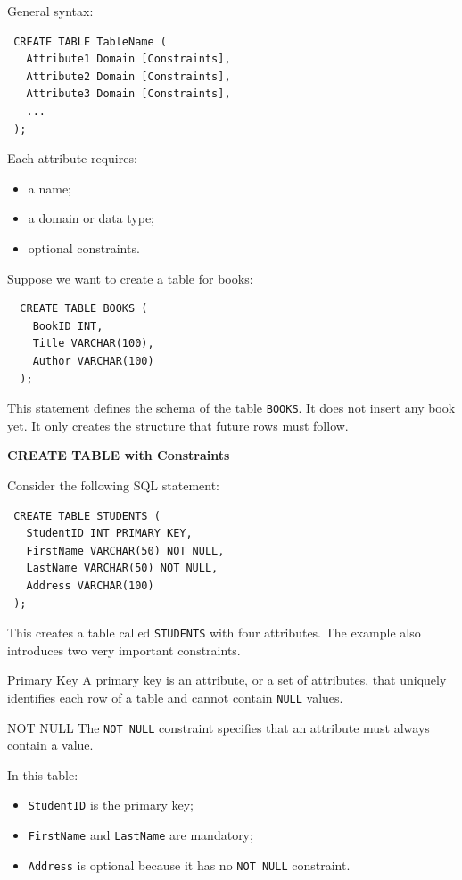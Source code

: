  General syntax:

 \begin{verbatim}
 CREATE TABLE TableName (
   Attribute1 Domain [Constraints],
   Attribute2 Domain [Constraints],
   Attribute3 Domain [Constraints],
   ...
 );
 \end{verbatim}

 Each attribute requires:
 \begin{itemize}
  \item a name;
  \item a domain or data type;
  \item optional constraints.
 \end{itemize}

 \vs
 \begin{example}
  Suppose we want to create a table for books:
  \begin{verbatim}
  CREATE TABLE BOOKS (
    BookID INT,
    Title VARCHAR(100),
    Author VARCHAR(100)
  );
  \end{verbatim}

  \vspace{-0.25cm}
  This statement defines the schema of the table \texttt{BOOKS}. It does not insert any book yet. It only creates the structure that future rows must follow.
 \end{example}


 \vs
 \begin{example}{\textbf{CREATE TABLE with Constraints}}

 Consider the following SQL statement:

 \begin{verbatim}
 CREATE TABLE STUDENTS (
   StudentID INT PRIMARY KEY,
   FirstName VARCHAR(50) NOT NULL,
   LastName VARCHAR(50) NOT NULL,
   Address VARCHAR(100)
 );
 \end{verbatim}

 \vspace{-0.25cm}
 This creates a table called \texttt{STUDENTS} with four attributes. The example also introduces two very important constraints.

 \begin{defbox}{Primary Key}
  A primary key is an attribute, or a set of attributes, that uniquely identifies each row of a table and cannot contain \texttt{NULL} values.
 \end{defbox}

 \begin{defbox}{NOT NULL}
  The \texttt{NOT NULL} constraint specifies that an attribute must always contain a value.
 \end{defbox}

 In this table:
 \begin{itemize}
  \item \texttt{StudentID} is the primary key;
  \item \texttt{FirstName} and \texttt{LastName} are mandatory;
  \item \texttt{Address} is optional because it has no \texttt{NOT NULL} constraint.
 \end{itemize}

\end{example}


